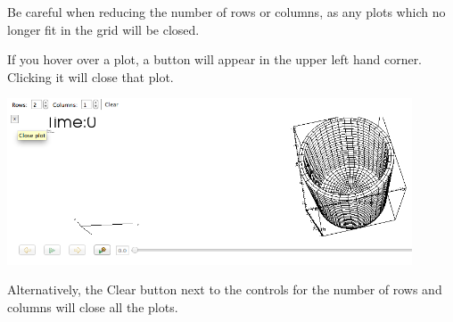 \documentclass{article}
\begin{document}
Be careful when reducing the number of rows or columns, as any plots which no
longer fit in the grid will be closed.

If you hover over a plot, a button will appear in the upper left hand
corner. Clicking it will close that plot.

\begin{center}
\includegraphics[width=12cm]{images/ClosePlotButton}
\end{center}

Alternatively, the Clear button next to the controls for the number of rows and
columns will close all the plots.
\end{document}
